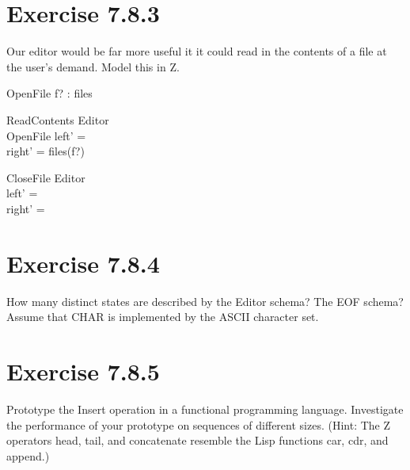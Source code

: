 \documentclass{article}
\begin{document}
\section{Exercise 7.8.3}
Our editor would be far more useful it it could read in the contents of a file at the user's demand. Model this in Z.

\begin{schema}{OpenFile}
    f? : \dom files
\end{schema}

\begin{schema}{ReadContents}
    \Delta Editor \\
    OpenFile
    \where
    left' = \langle \rangle \\
    right' = files(f?)
\end{schema}

\begin{schema}{CloseFile}
    \Delta Editor \\
    \where
    left' = \langle \rangle \\
    right' = \langle \rangle
\end{schema}

\section{Exercise 7.8.4}
How many distinct states are described by the Editor schema? The EOF schema? Assume that CHAR is implemented by the ASCII character set.

\section{Exercise 7.8.5}
Prototype the Insert operation in a functional programming language. Investigate the performance of your prototype on sequences of different sizes. (Hint: The Z operators head, tail, and concatenate resemble the Lisp functions car, cdr, and append.)
\end{document}
